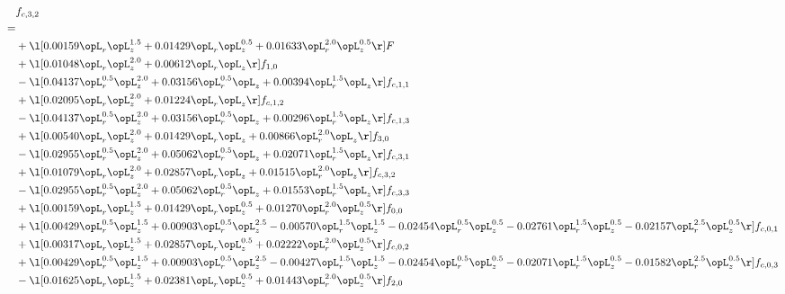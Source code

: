 \begin{alignat}{2} 
\label{eq:f_32_1} 
& f_{c,3,2} \nonumber \\ 
 = \\ 
& + \l[  0.00159 \opL_r \opL_z^{1.5} +  0.01429 \opL_r \opL_z^{0.5} +  0.01633 \opL_r^{2.0} \opL_z^{0.5}  \r] F \nonumber \\ 
& + \l[  0.01048 \opL_r \opL_z^{2.0} +  0.00612 \opL_r \opL_z  \r] f_{1,0} \nonumber \\ 
& - \l[  0.04137 \opL_r^{0.5} \opL_z^{2.0} +  0.03156 \opL_r^{0.5} \opL_z +  0.00394 \opL_r^{1.5} \opL_z  \r] f_{c,1,1} \nonumber \\ 
& + \l[  0.02095 \opL_r \opL_z^{2.0} +  0.01224 \opL_r \opL_z  \r] f_{c,1,2} \nonumber \\ 
& - \l[  0.04137 \opL_r^{0.5} \opL_z^{2.0} +  0.03156 \opL_r^{0.5} \opL_z +  0.00296 \opL_r^{1.5} \opL_z  \r] f_{c,1,3} \nonumber \\ 
& + \l[  0.00540 \opL_r \opL_z^{2.0} +  0.01429 \opL_r \opL_z +  0.00866 \opL_r^{2.0} \opL_z  \r] f_{3,0} \nonumber \\ 
& - \l[  0.02955 \opL_r^{0.5} \opL_z^{2.0} +  0.05062 \opL_r^{0.5} \opL_z +  0.02071 \opL_r^{1.5} \opL_z  \r] f_{c,3,1} \nonumber \\ 
& + \l[  0.01079 \opL_r \opL_z^{2.0} +  0.02857 \opL_r \opL_z +  0.01515 \opL_r^{2.0} \opL_z  \r] f_{c,3,2} \nonumber \\ 
& - \l[  0.02955 \opL_r^{0.5} \opL_z^{2.0} +  0.05062 \opL_r^{0.5} \opL_z +  0.01553 \opL_r^{1.5} \opL_z  \r] f_{c,3,3} \nonumber \\ 
& + \l[  0.00159 \opL_r \opL_z^{1.5} +  0.01429 \opL_r \opL_z^{0.5} +  0.01270 \opL_r^{2.0} \opL_z^{0.5}  \r] f_{0,0} \nonumber \\ 
& + \l[  0.00429 \opL_r^{0.5} \opL_z^{1.5} +  0.00903 \opL_r^{0.5} \opL_z^{2.5}   -0.00570 \opL_r^{1.5} \opL_z^{1.5}   -0.02454 \opL_r^{0.5} \opL_z^{0.5}   -0.02761 \opL_r^{1.5} \opL_z^{0.5}   -0.02157 \opL_r^{2.5} \opL_z^{0.5}  \r] f_{c,0,1} \nonumber \\ 
& + \l[  0.00317 \opL_r \opL_z^{1.5} +  0.02857 \opL_r \opL_z^{0.5} +  0.02222 \opL_r^{2.0} \opL_z^{0.5}  \r] f_{c,0,2} \nonumber \\ 
& + \l[  0.00429 \opL_r^{0.5} \opL_z^{1.5} +  0.00903 \opL_r^{0.5} \opL_z^{2.5}   -0.00427 \opL_r^{1.5} \opL_z^{1.5}   -0.02454 \opL_r^{0.5} \opL_z^{0.5}   -0.02071 \opL_r^{1.5} \opL_z^{0.5}   -0.01582 \opL_r^{2.5} \opL_z^{0.5}  \r] f_{c,0,3} \nonumber \\ 
& - \l[  0.01625 \opL_r \opL_z^{1.5} +  0.02381 \opL_r \opL_z^{0.5} +  0.01443 \opL_r^{2.0} \opL_z^{0.5}  \r] f_{2,0} \nonumber \\ 

\end{alignat}
